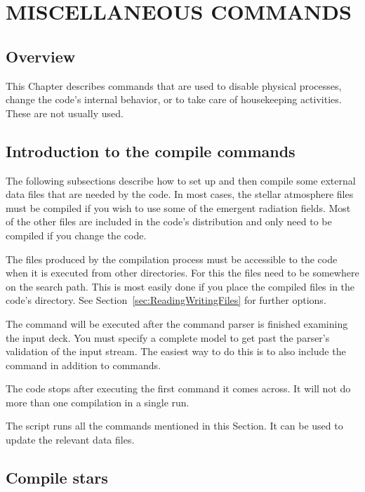 \chapter{MISCELLANEOUS COMMANDS}
\label{sec:MiscellaneousCommands}

\section{Overview}

This Chapter describes commands that are used to disable physical
processes, change the code's internal behavior, or to take care of
housekeeping activities.
These are not usually used.

\section{Introduction to the compile commands}

The following subsections describe how to set up and then compile some
external data files that are needed by the code.
In most cases, the stellar atmosphere
files must be compiled if you wish to use some of the
 emergent radiation fields.
Most of the other files are included in the code's distribution and only
need to be compiled if you change the code.

The files produced by the compilation process must be accessible to the
code when it is executed from other directories.
For this the files need to be somewhere on the search path.
This is most easily done
if you place the compiled files in
the code's  directory.
See Section~\ref{sec:ReadingWritingFiles} for further options.

The  command will be executed after
the command parser is finished
examining the input deck.
You must specify a complete model to get past
the parser's validation of the input stream.
The easiest way to do this
is to also include the  command
in addition to
 commands.

The code stops after executing the first 
command it comes across.
It will not do more than one compilation in a single run.

The script  runs all the 
commands mentioned in this Section.
It can be used to update the relevant data files.

\section{Compile stars}

